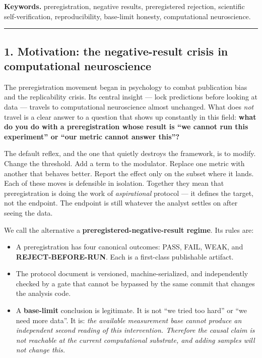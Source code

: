 \documentclass[
]{article}
\providecommand{\tightlist}{%
  \setlength{\itemsep}{0pt}\setlength{\parskip}{0pt}}
\begin{document}
\textbf{Keywords.} preregistration, negative results, preregistered
rejection, scientific self-verification, reproducibility, base-limit
honesty, computational neuroscience.

\begin{center}\rule{0.5\linewidth}{0.5pt}\end{center}

\subsection{1. Motivation: the negative-result crisis in computational
neuroscience}\label{motivation-the-negative-result-crisis-in-computational-neuroscience}

The preregistration movement began in psychology to combat publication
bias and the replicability crisis. Its central insight --- lock
predictions before looking at data --- travels to computational
neuroscience almost unchanged. What does \emph{not} travel is a clear
answer to a question that shows up constantly in this field:
\textbf{what do you do with a preregistration whose result is ``we
cannot run this experiment'' or ``our metric cannot answer this''?}

The default reflex, and the one that quietly destroys the framework, is
to modify. Change the threshold. Add a term to the modulator. Replace
one metric with another that behaves better. Report the effect only on
the subset where it lands. Each of these moves is defensible in
isolation. Together they mean that preregistration is doing the work of
\emph{aspirational} protocol --- it defines the target, not the
endpoint. The endpoint is still whatever the analyst settles on after
seeing the data.

We call the alternative a \textbf{preregistered-negative-result regime}.
Its rules are:

\begin{itemize}
\tightlist
\item
  A preregistration has four canonical outcomes: PASS, FAIL, WEAK, and
  \textbf{REJECT-BEFORE-RUN}. Each is a first-class publishable
  artifact.
\item
  The protocol document is versioned, machine-serialized, and
  independently checked by a gate that cannot be bypassed by the same
  commit that changes the analysis code.
\item
  A \textbf{base-limit} conclusion is legitimate. It is not ``we tried
  too hard'' or ``we need more data''. It is: \emph{the available
  measurement base cannot produce an independent second reading of this
  intervention. Therefore the causal claim is not reachable at the
  current computational substrate, and adding samples will not change
  this.}
\end{itemize}
\end{document}
